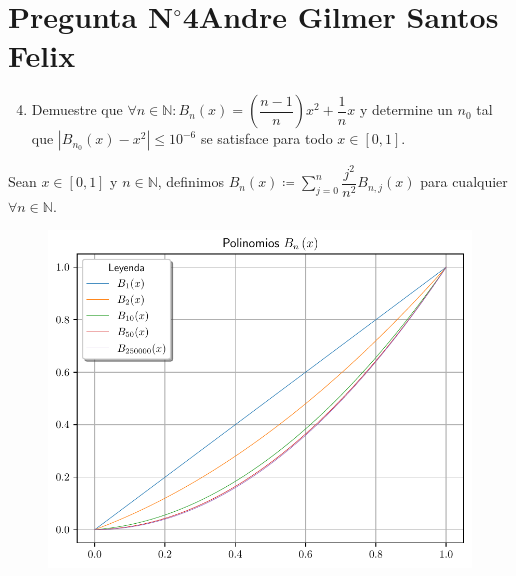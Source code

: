 \section{Pregunta N$^{\circ}$4\qquad Andre Gilmer Santos Felix}



\begin{frame}
	\begin{enumerate}\setcounter{enumi}{3}
		\item

		      Demuestre que
		      \begin{math}
			      \forall n\in\mathbb{N}:
			      B_{n}\left(x\right)=
			      \left(\dfrac{n-1}{n}\right)x^{2}+
			      \dfrac{1}{n}x
		      \end{math}
		      y determine un $n_{0}$ tal que
		      \begin{math}
			      \left|
			      B_{n_{0}}\left(x\right)-
			      x^{2}
			      \right|\leq
			      10^{-6}
		      \end{math}
		      se satisface para todo $x\in\left[0,1\right]$.
	\end{enumerate}

	\begin{solution}
		Sean $x\in\left[0,1\right]$ y $n\in\mathbb{N}$, definimos
		\begin{math}
			B_{n}\left(x\right)\coloneqq
			\sum\limits_{j=0}^{n}
			\dfrac{j^{2}}{n^{2}}
			B_{n,j}\left(x\right)
		\end{math}
		para cualquier
		\begin{math}
			\forall n\in\mathbb{N}
		\end{math}.

		\begin{figure}[ht!]
			\centering
			\includegraphics[width=.55\paperwidth]{p4}
		\end{figure}
	\end{solution}
\end{frame}

